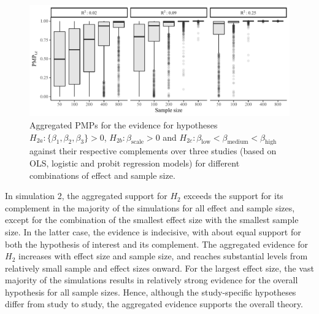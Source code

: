 \documentclass[11pt,reqno]{article}
\begin{document}
\begin{figure}[ht]
   \centerline{\includegraphics[width=14cm]{r-files-bes-klugkist-volker-2022/Figures/sim2_box}}
 \caption{Aggregated PMPs for the evidence for hypotheses $H_{2a}: \{\beta_1, \beta_2, \beta_3\} > 0$, $H_{2b}: \beta_{\text{scale}} > 0$ and $H_{2c}: \beta_{\text{low}} < \beta_{\text{medium}} < \beta_{\text{high}}$ against their respective complements over three studies (based on OLS, logistic and probit regression models) for different combinations of effect and sample size.}
\label{sim2_box}
\end{figure}


In simulation 2, the aggregated support for $H_2$ exceeds the support for its complement in the majority of the simulations for all effect and sample sizes, except for the combination of the smallest effect size with the smallest sample size.
In the latter case, the evidence is indecisive, with about equal support for both the hypothesis of interest and its complement.
The aggregated evidence for $H_2$ increases with effect size and sample size, and reaches substantial levels from relatively small sample and effect sizes onward.
For the largest effect size, the vast majority of the simulations results in relatively strong evidence for the overall hypothesis for all sample sizes.
Hence, although the study-specific hypotheses differ from study to study, the aggregated evidence supports the overall theory.
\end{document}
